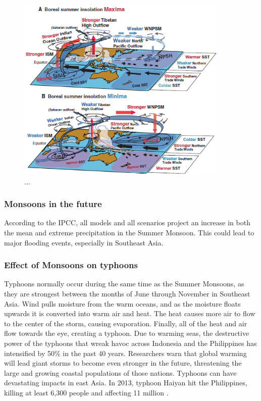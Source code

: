 \begin{figure}[h!]
	\includegraphics[width=0.90\textwidth]{graphics/East_Asian_Monsoon_Beck.jpg}
	\caption{\citet{beck2018550}...}
	\label{fig:East_Asian_Monsoon_Beck}
\end{figure}


\subsubsection{Monsoons in the future}
According to the IPCC, all models and all scenarios project an increase in both the mean and extreme precipitation in the Summer Monsoon. This could lead to major flooding events, especially in Southeast Asia.\citep{monsoonfuture}

\subsubsection{Effect of Monsoons on typhoons}
Typhoons normally occur during the same time as the Summer Monsoons, as they are strongest between the months of June through November in Southeast Asia. Wind pulls moisture from the warm oceans, and as the moisture floats upwards it is converted into warm air and heat. The heat causes more air to flow to the center of the storm, causing evaporation. Finally, all of the heat and air flow towards the eye, creating a typhoon. Due to warming seas, the destructive power of the typhoons that wreak havoc across Indonesia and the Philippines has intensified by 50\% in the past 40 years. Researchers warn that global warming will lead giant storms to become even stronger in the future, threatening the large and growing coastal populations of those nations. Typhoons can have devastating impacts in east Asia. In 2013, typhoon Haiyan hit the Philippines, killing at least 6,300 people and affecting 11 million \citep{typhoon}.

